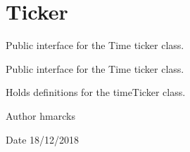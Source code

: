 \hypertarget{group__Time}{}\section{Ticker}
\label{group__Time}


Public interface for the Time ticker class.  


Public interface for the Time ticker class. 

Holds definitions for the time\+Ticker class.

\begin{DoxyAuthor}{Author}
hmarcks
\end{DoxyAuthor}
\begin{DoxyDate}{Date}
18/12/2018 
\end{DoxyDate}

